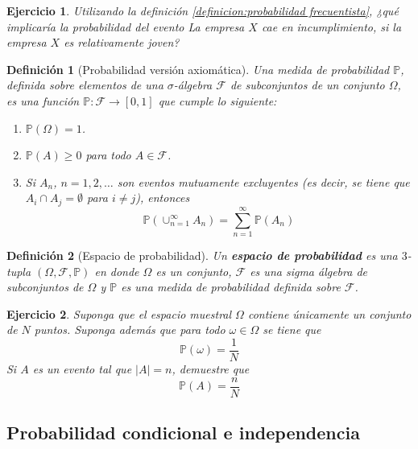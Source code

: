 \documentclass[11pt]{report}
\theoremstyle{break}
\newtheorem{definicion}{Definición}[chapter]
\newtheorem{ejercicio}{Ejercicio}[chapter]
\theoremstyle{break}
\begin{document}
\begin{ejercicio}
Utilizando la definición \ref{definicion:probabilidad frecuentista}, ¿qué implicaría la probabilidad del evento \textit{La empresa $X$ cae en incumplimiento}, si la empresa $X$ es relativamente joven?
\end{ejercicio}

\begin{definicion}[Probabilidad versión axiomática]
Una medida de probabilidad $\mathbb{P}$, definida sobre elementos de una $\sigma$-álgebra $\mathcal{F}$ de subconjuntos de un conjunto $\Omega$, es una función $\mathbb{P}:\mathcal{F} \rightarrow [0,1]$ que cumple lo siguiente:

\begin{enumerate}
\item $\mathbb{P}(\Omega) = 1$.
\item $\mathbb{P}(A) \geq 0$ para todo $A \in \mathcal{F}$.
\item Si $A_n$, $n=1,2,\ldots$ son eventos mutuamente excluyentes (es decir, se tiene que  $A_i \cap A_j = \emptyset$ para $i \neq j$), entonces 
$$
\mathbb{P}\left(\cup_{n=1}^{\infty}A_n \right) = \sum_{n=1}^{\infty}\mathbb{P}(A_n)
$$
\end{enumerate}
\end{definicion}

\begin{definicion}[Espacio de probabilidad]
\label{definicion:espacio de probabilidad}
Un \textbf{espacio de probabilidad} es una $3$-tupla $\left( \Omega, \mathcal{F}, \mathbb{P} \right)$ en donde $\Omega$ es un conjunto, $\mathcal{F}$ es una sigma álgebra de subconjuntos de $\Omega$ y $\mathbb{P}$ es una medida de probabilidad definida sobre $\mathcal{F}$.
\end{definicion}

\begin{ejercicio}
Suponga que el espacio muestral $\Omega$ contiene únicamente un conjunto de $N$ puntos. Suponga además que para todo $\omega \in \Omega$ se tiene que
$$
\mathbb{P}(\omega) = \dfrac{1}{N}
$$
Si $A$ es un evento tal que $|A| = n$, demuestre que
$$
\mathbb{P}(A) = \dfrac{n}{N}
$$
\end{ejercicio}
\subsection{Probabilidad condicional e independencia}
\end{document}
